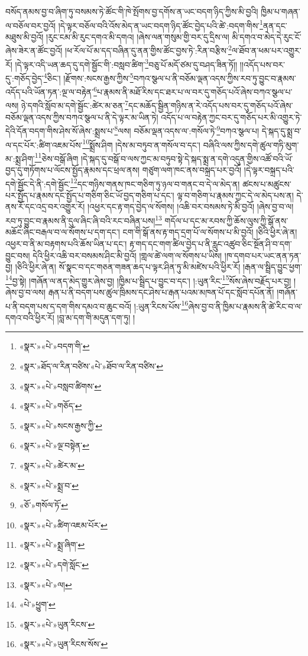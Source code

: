 བསོད་ནམས་བྱ་བ་ཞིག་ཏུ་བསམས་ཏེ་ཚོང་གི་ཁེ་སྤོགས་བྱ་དགོས་ན་ཡང་བདག་ཉིད་ཀྱིས་མི་བྱའི། ཁྱིམ་པ་གཞན་ལ་བཅོལ་བར་བྱའོ། །དེ་ལྟར་བཅོལ་བའི་འོས་མེད་ན་ཡང་བདག་ཉིད་ཚོང་བྱེད་པའི་ཚེ་:བདག་གིས་\footnote{«སྣར་»«པེ་»བདག་གི་}ནན་དང་མཐུས་མི་བྱའོ། །རུང་ངམ་མི་རུང་དགའ་མི་དགའ། །ཞེས་ལན་གསུམ་གྱི་བར་དུ་དྲིས་ལ། མི་དགའ་བ་མེད་དེ་རུང་ངོ་ཞེས་ཟེར་ན་ཚོང་བྱའོ། །ཕ་རོལ་པོ་མ་དད་བཞིན་དུ་ནན་གྱིས་ཚོང་བྱས་ཏེ་:རིན་བརྩིས་\footnote{«སྣར་»ཐོད་ལ་རིན་བཙིས་«པེ་»ཐོབ་ལ་རིན་བཙིས་}ལ་ཐོབ་ན་ཕམ་པར་འགྱུར་རོ། །དེ་ལྟར་འདི་ཡན་ཆད་དུ་དགེ་སྦྱོང་གི་:བསླབ་ཚིག་\footnote{«སྣར་»«པེ་»བསླབ་ཚིགས་}བཅུ་པོ་མདོ་ཙམ་དུ་བཤད་ཟིན་ཏོ།། །།འདོད་པས་བར་དུ་:གཅོད་བྱེད་\footnote{«སྣར་»«པེ་»གཅོད་}ཅིང་། །རྫོགས་:སངས་རྒྱས་ཀྱིས་\footnote{«སྣར་»«པེ་»སངས་རྒྱས་ཀྱི་}བཀའ་སྩལ་པ་ནི་བཅོམ་ལྡན་འདས་ཀྱིས་རབ་ཏུ་བྱུང་བ་རྣམས་འདོད་པའི་ཡོན་ཏན་:ལྔ་ལ་བརྟེན་\footnote{«སྣར་»«པེ་»ལྔ་བསྟེན་}པ་རྣམས་ནི་མཐོ་རིས་དང་ཐར་པ་ལ་བར་དུ་གཅོད་པའོ་ཞེས་བཀའ་སྩལ་པ་ལས། ཉེ་དགའི་སློབ་མ་དགེ་སྦྱོང་:ཚེར་མ་ཅན་\footnote{«སྣར་»«པེ་»ཚེར་མ་}དང་མཆོད་སྦྱིན་གཉིས་ན་རེ་འདོད་པས་བར་དུ་གཅོད་པའོ་ཞེས་བཅོམ་ལྡན་འདས་ཀྱིས་བཀའ་སྩལ་པ་ནི་དེ་ལྟར་མ་ཡིན་ཏེ། འདོད་པ་ལ་བརྟེན་ཀྱང་བར་དུ་གཅོད་པར་མི་འགྱུར་ཏེ་དེའི་དོན་བདག་གིས་ཤེས་སོ་ཞེས་:སྨྲས་པ་\footnote{«སྣར་»«པེ་»སྨྲ་བ་}ལས། བཅོམ་ལྡན་འདས་ལ་:གསོལ་ཏེ་\footnote{«ཅོ་»གསོལ་ཏོ་}བཀའ་སྩལ་པ། དེ་སྐད་དུ་སྨྲ་བ་ལ་དང་པོར་:ཚིག་འཇམ་པོས་\footnote{«སྣར་»«པེ་»ཚིག་འཇམ་པོར་}སྨྲོས་ཤིག །དེས་མ་བཏུབ་ན་གསོལ་བ་དང་། བཞིའི་ལས་ཀྱིས་དགེ་ཚུལ་གཏི་མུག་མ་:སྨྲ་ཤིག་\footnote{«སྣར་»«པེ་»སྨྲ་ཞིག་}ཅེས་བསྒོ་ཞིག །དེ་སྐད་དུ་བསྒོ་བ་ལས་ཀྱང་མ་བཏུབ་སྟེ་དེ་སྐད་སྨྲ་ན་དགེ་འདུན་གྱིས་འཚོ་བའི་ཡོ་བྱད་དུ་གཏོགས་པ་ལོངས་སྤྱོད་རྣམས་དང་ཕྲལ་ནས། གཙུག་ལག་ཁང་ནས་བསྐྲད་པར་བྱའོ། །དེ་ལྟར་བསྐྲད་པའི་དགེ་སྦྱོང་དེ་ནི་:དགེ་སྦྱོང་\footnote{«སྣར་»«པེ་»དགེ་སློང་}དང་གཉིས་གནས་ཁང་གཅིག་ཏུ་ཉལ་བ་གནང་བ་དེ་ལ་མེད་ན། ཚངས་པ་མཚུངས་པར་སྤྱོད་པ་རྣམས་དང་སྤྱོད་པ་གཅིག་ཅིང་ཡོ་བྱད་གཅིག་པ་དང་། ལྟ་བ་གཅིག་པ་རྣམས་ཀྱང་དེ་ལ་མེད་པས་ན། དེ་ནས་རོ་དང་འདྲ་བར་འགྱུར་རོ། །འཕྱར་དང་རྟ་གད་བྱེད་ལ་སོགས། །འཆི་བར་བསམས་ཏེ་མི་བྱའོ། །ཞེས་བྱ་བ་ལ། རབ་ཏུ་བྱུང་བ་རྣམས་ནི་དུལ་ཞིང་ཞི་བའི་རང་བཞིན་པས།\footnote{«སྣར་»«པེ་»ལ།} གདོལ་པ་དང་མ་རབས་ཀྱི་ཆོས་ལུས་ཀྱི་སྒོ་ནས་མཆོང་ཞིང་བརྒལ་བ་ལ་སོགས་པ་དག་དང་། ངག་གི་སྒོ་ནས་རྟ་གད་དྲག་པོ་ལ་སོགས་པ་མི་བྱའོ། །ཅིའི་ཕྱིར་ཞེ་ན། འཕྱར་བ་ནི་མ་བརྟགས་པའི་ཆོས་ཡིན་པ་དང་། རྟ་གད་དང་གག་ཚིལ་བྱེད་པ་ནི་རླུང་འཚུབ་ཅིང་སྔོན་ཤི་བ་དག་བྱུང་བས། དེའི་ཕྱིར་འཆི་བར་བསམས་ཤིང་མི་བྱའོ། །གླལ་ཚེ་ལག་ལ་སོགས་པ་ཡིས། །ཁ་དགབ་པར་ཡང་ནན་ཏན་བྱ། །ཅིའི་ཕྱིར་ཞེ་ན། སོ་སྣང་བ་དང་གཅན་གཟན་ཆད་པ་ལྟར་ཤིན་ཏུ་མི་མཛེས་པའི་ཕྱིར་རོ། །རྒན་ལ་སྦྲིད་བྱུང་ཕྱག་\footnote{«པེ་»ཕྱུག་}བྱ་སྟེ། །གཞོན་ལ་ནད་མེད་གྱུར་ཞེས་བྱ། །ཁྱིམ་པ་སྦྲིད་པ་བྱུང་བ་དང་། །:ཡུན་རིང་\footnote{«སྣར་»«པེ་»ཡུན་རིངས་}སོས་ཞེས་བརྗོད་པར་བྱ། །ཞེས་བྱ་བ་ལས། རྒན་པ་ནི་བདག་པས་ཚུལ་ཁྲིམས་དང་ཤེས་པ་རྒན་པའམ་མཁན་པོ་དང་སློབ་དཔོན་ནོ། །གཞོན་པ་ནི་བདག་པས་ད་དག་གིས་དམའ་བ་ཆུང་བའོ། །:ཡུན་རིངས་པོས་\footnote{«སྣར་»«པེ་»ཡུན་རིངས་སོས་}ཞེས་བྱ་བ་ནི་ཁྱིམ་པ་རྣམས་ནི་ཚེ་རིང་བ་ལ་དགའ་བའི་ཕྱིར་རོ། །བླ་མ་དག་གི་མདུན་དག་ཏུ། །
